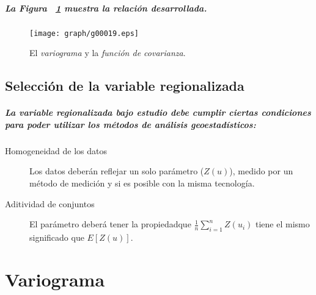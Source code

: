 \paragraph{
La Figura ~\ref{fig:VariogramaVSCovarianza} muestra la relación desarrollada.
}
\begin{figure}[ht]
\centering
\texttt{[image: graph/g00019.eps]}
\caption[El \emph{variograma} y la \emph{covarianza}]{El \emph{variograma} y la \emph{función de covarianza}.}
\label{fig:VariogramaVSCovarianza}
\end{figure}



\section{Selección de la variable regionalizada}
\paragraph{
La \emph{variable regionalizada} bajo estudio debe cumplir ciertas condiciones para poder utilizar los métodos de análisis geoestadísticos:
}
\begin{description}
\item[Homogeneidad de los datos] Los datos deberán reflejar un solo parámetro ($Z(u)$), medido por un método de medición y si es posible con la misma tecnología.
\item[Aditividad de conjuntos] El parámetro deberá tener la propiedad\footnotemark[12] que $\frac{1}{n}\sum_{i=1}^nZ(u_i)$ tiene el mismo significado que $E[Z(u)]$.
\end{description}




\chapter{Variograma}
